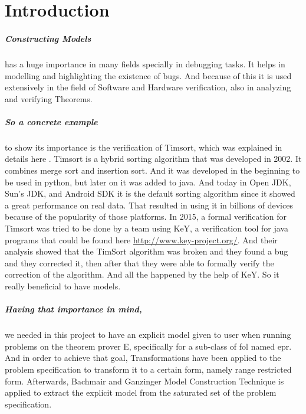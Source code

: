 \chapter{Introduction}\label{chap:intro}

	\nocite{*} 
	
	\paragraph{    Constructing Models} has a huge importance in many fields specially in debugging tasks. It helps in modelling and highlighting the existence of bugs. And because of this it is used extensively in the field of Software and Hardware verification, also in analyzing and verifying Theorems.

	\paragraph{    So a concrete example} to show its importance is the verification of Timsort, which was explained in details here \cite{TIMSORT}. Timsort is a hybrid sorting algorithm that was developed in 2002. It combines merge sort and insertion sort. And it was developed in the beginning to be used in python, but later on it was added to java. And today in Open JDK, Sun's JDK, and Android SDK it is the default sorting algorithm since it showed a great performance on real data. That resulted in using it in billions of devices because of the popularity of those platforms. In 2015, a formal verification for Timsort was tried to be done by a team using KeY, a verification tool for java programs that could be found here \url{http://www.key-project.org/}. And their analysis showed that the TimSort algorithm was broken and they found a bug and they corrected it, then after that they were able to formally verify the correction of the algorithm. And all the happened by the help of KeY. So it really beneficial to have models.

	\paragraph{    Having that importance in mind,} we needed in this project to have an explicit model given to user when running problems on the theorem prover E, specifically for a sub-class of \ac{fol} named \ac{epr}. And in order to achieve that goal, Transformations have been applied to the problem specification to transform it to a certain form, namely range restricted form. Afterwards, Bachmair and Ganzinger Model Construction Technique is applied to extract the explicit model from the saturated set of the problem specification. 


